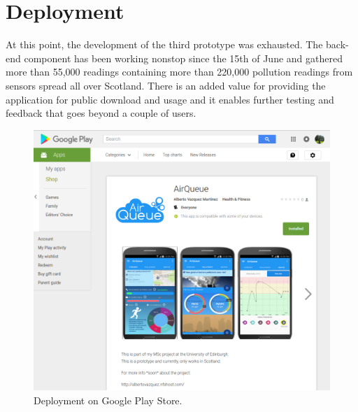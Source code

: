 \section{Deployment}
At this point, the development of the third prototype was exhausted. The back-end component has been working nonstop since the 15th of June and gathered more than 55,000 readings containing more than 220,000 pollution readings from sensors spread all over Scotland. There is an added value for providing the application for public download and usage and it enables further testing and feedback that goes beyond a couple of users.

\begin{figure}[H]
\begin{adjustbox}{width=.8\textwidth,center=\textwidth}
  \centering
  \includegraphics[scale=1]{images/play_store.png}
\end{adjustbox}
  \caption[Deployment on Google Play Store]{Deployment on Google Play Store.\footnotemark}
  \label{fig:deployment_play_store}
\end{figure}


